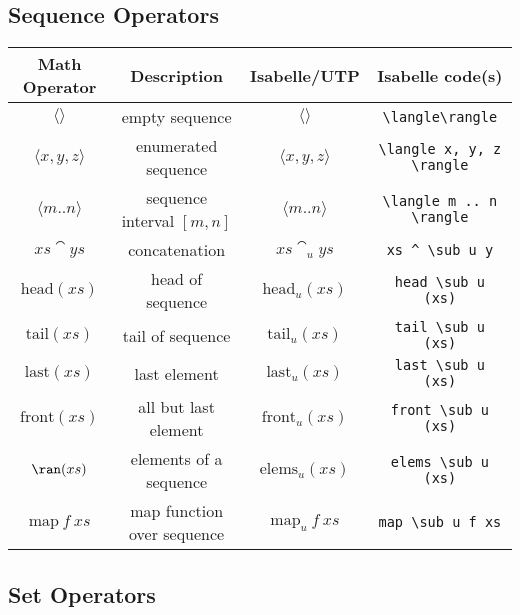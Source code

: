 \documentclass[11pt]{article}
\begin{document}
\subsection{Sequence Operators}

\begin{center}
\begin{tabular}{|c|c|c|c|} \hline
  \textbf{Math Operator}         & \textbf{Description}        & \textbf{Isabelle/UTP}          & \textbf{Isabelle code(s)} \\ \hline
  $\langle\rangle$               & empty sequence              & $\langle\rangle$               & \verb|\langle\rangle| \\
  $\langle x, y, z \rangle$      & enumerated sequence         & $\langle x, y, z \rangle$ & \verb|\langle x, y, z \rangle| \\
  $\langle m .. n \rangle$       & sequence interval $[m,n]$   & $\langle m .. n \rangle$       & \verb|\langle m .. n \rangle| \\
  $xs \cat ys$                   & concatenation               & $xs \cat_u ys$                 & \verb|xs ^ \sub u y| \\
  $\textrm{head}(xs)$            & head of sequence            & $\textrm{head}_u(xs)$          & \verb|head \sub u (xs)| \\
  $\textrm{tail}(xs)$            & tail of sequence            & $\textrm{tail}_u(xs)$          & \verb|tail \sub u (xs)| \\
  $\textrm{last}(xs)$            & last element                & $\textrm{last}_u(xs)$          & \verb|last \sub u (xs)| \\
  $\textrm{front}(xs)$           & all but last element        & $\textrm{front}_u(xs)$         & \verb|front \sub u (xs)| \\
  $\ran(xs)$                     & elements of a sequence      & $\textrm{elems}_u(xs)$         & \verb|elems \sub u (xs)| \\
  $\textrm{map}~f~xs$            & map function over sequence  & $\textrm{map}_u~f~xs$          & \verb|map \sub u f xs| \\
  \hline
\end{tabular}
\end{center}

\subsection{Set Operators}
\end{document}
